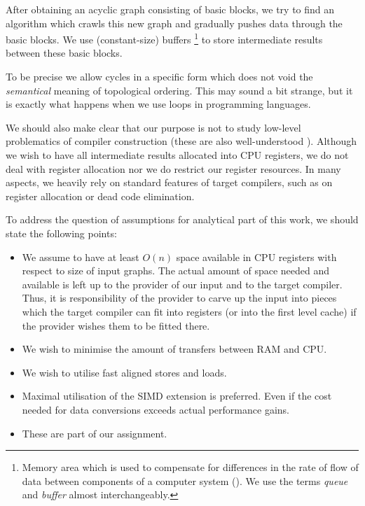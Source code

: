 
  After obtaining an acyclic graph consisting of basic blocks, we try to find an algorithm which crawls this new graph and gradually pushes data through the basic blocks. We use (constant-size) buffers \footnote{Memory area which is used to compensate for differences in the rate of flow of data between components of a computer system (\cite{thesarus}). We use the terms \emph{queue} and \emph{buffer} almost interchangeably.} to store intermediate results between these basic blocks.


\begin{rem}
  To be precise we allow cycles in a specific form which does not void the \emph{semantical} meaning of topological ordering. This may sound a bit strange, but it is exactly what happens when we use loops in programming languages.
\end{rem}

  We should also make clear that our purpose is not to study low-level problematics of compiler construction (these are also well-understood \cite{compiler_theory}). Although we wish to have all intermediate results allocated into CPU registers, we do not deal with register allocation nor we do restrict our register resources. In many aspects, we heavily rely on standard features of target compilers, such as on register allocation or dead code elimination.

To address the question of assumptions for analytical part of this work, we should state the following points:
\begin{itemize}
  \item We assume to have at least $O(n)$ space available in CPU registers with respect to size of input graphs. The actual amount of space needed and available is left up to the provider of our input and to the target compiler. Thus, it is responsibility of the provider to carve up the input into pieces which the target compiler can fit into registers (or into the first level cache) if the provider wishes them to be fitted there.
  \item We wish to minimise the amount of transfers between RAM and CPU.
  \item We wish to utilise fast aligned stores and loads.
  \item Maximal utilisation of the SIMD extension is preferred. Even if the cost needed for data conversions exceeds actual performance gains.
  \item These are part of our assignment.
\end{itemize}

